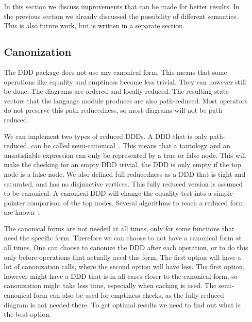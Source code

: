 In this section we discuss improvements that can be made for better results. In the previous section we already discussed the possibility of different semantics. This is also future work, but is written in a separate section.

\subsection{Canonization}
The DDD package does not use any canonical form. This means that some operations like equality and emptiness become less trivial. They can however still be done. The diagrams are ordered and locally reduced. The resulting state-vectors that the language module produces are also path-reduced. Most operators do not preserve this path-reducedness, so most diagrams will not be path-reduced. 

We can implement two types of reduced DDDs. A DDD that is only path-reduced, can be called semi-canonical~\cite{ddds}. This means that a tautology and an unsatisfiable expression can only be represented by a true or false node. This will make the checking for an empty DDD trivial, the DDD is only empty if the top node is a false node. We also defined full reducedness as a DDD that is tight and saturated, and has no disjunctive vertices. This fully reduced version is assumed to be canonical. A canonical DDD will change the equality test into a simple pointer comparison of the top nodes.
Several algorithms to reach a reduced form are known~\cite{ddd-mt-98}.

The canonical forms are not needed at all times, only for some functions that need the specific form. Therefore we can choose to not have a canonical form at all times. One can choose to canonize the DDD after each operation, or to do this only before operations that actually need this form. The first option will have a lot of canonization calls, where the second option will have less. The first option, however might have a DDD that is in all cases closer to the canonical form, so canonization might take less time, especially when caching is used. The semi-canonical form can also be used for emptiness checks, as the fully reduced diagram is not needed there. To get optimal results we need to find out what is the best option.


